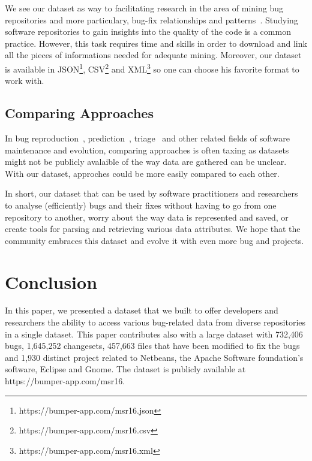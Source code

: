\documentclass{sig-alternate-05-2015}
\begin{document}
We see our dataset as way to facilitating research in the area
of mining bug repositories and more particulary, bug-fix relationships and patterns~\cite{Kim2013e,Saha2014,Martinez2014}. Studying software repositories to gain insights
into the quality of the code is a common practice.
However, this task requires
time and skills in order to download and link all the pieces of informations
needed for adequate mining. Moreover, our dataset is available in JSON\footnote{https://bumper-app.com/msr16.json}, CSV\footnote{https://bumper-app.com/msr16.csv} and XML\footnote{https://bumper-app.com/msr16.xml} so one can choose his favorite format to work with.

\subsection{Comparing Approaches}
\label{sub:Comparing Approaches}

In bug reproduction~\cite{Chen2013,Nayrolles2015}, prediction~\cite{Kamei2010,Bhattacharya2011}, triage~\cite{Anvik2006,Jeong2009,Kong2011} and other related fields of software maintenance and evolution, comparing approaches is often taxing as datasets might not be publicly avalaible of the way data are gathered can be unclear.
With our dataset, approches could be more easily compared to each other.

In short, our dataset that can be used by software practitioners
and researchers to analyse (efficiently) bugs and their fixes without having
to go from one repository to another, worry about the way data is represented
and saved, or create tools for parsing and retrieving various data attributes.
We hope that the community embraces this dataset and evolve it with even more bug and projects.

\section{Conclusion}
\label{sec:Conclusion}

In this paper, we presented a dataset that we built to offer developers and
researchers the ability to access various bug-related data
from diverse repositories in a single dataset. This paper
contributes also with a large dataset with 732,406 bugs,
1,645,252 changesets, 457,663 files that have been modified to fix the bugs
and 1,930 distinct project
related to Netbeans, the Apache Software foundation's
software, Eclipse and Gnome. The dataset is publicly available at https://bumper-app.com/msr16.
\end{document}
